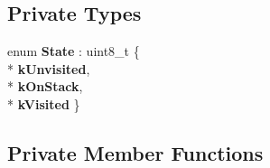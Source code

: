 \subsection*{Private Types}
\begin{DoxyCompactItemize}
\item 
enum {\bfseries State} \+: uint8\+\_\+t \{ \\*
{\bfseries k\+Unvisited}, 
\\*
{\bfseries k\+On\+Stack}, 
\\*
{\bfseries k\+Visited}
 \}\hypertarget{classv8_1_1internal_1_1compiler_1_1_int64_lowering_ab35b753a276b458a1d2917725ca4089c}{}\label{classv8_1_1internal_1_1compiler_1_1_int64_lowering_ab35b753a276b458a1d2917725ca4089c}

\end{DoxyCompactItemize}
\subsection*{Private Member Functions}
